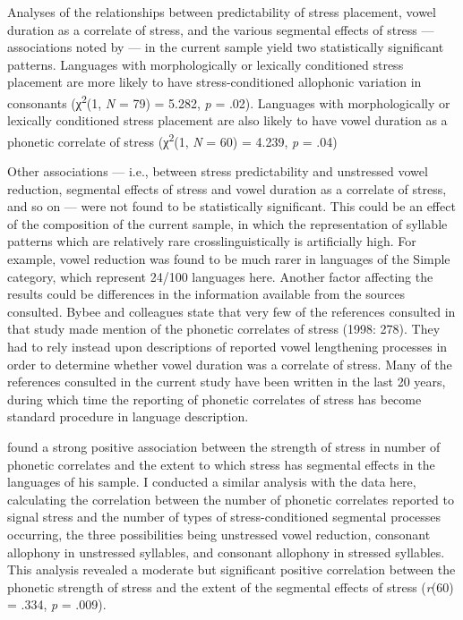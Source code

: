   Analyses of the relationships between predictability of stress placement, vowel duration as a correlate of stress, and the various segmental effects of stress — associations noted by \citet{BybeeEtAl1998} — in the current sample yield two statistically significant patterns. Languages with morphologically or lexically conditioned stress placement are more likely to have stress-conditioned allophonic variation in consonants (χ\textsuperscript{2}(1, \textit{N} = 79) = 5.282, \textit{p} = .02). Languages with morphologically or lexically conditioned stress placement are also likely to have vowel duration as a phonetic correlate of stress (χ\textsuperscript{2}(1, \textit{N} = 60) = 4.239, \textit{p} = .04)

  Other associations — i.e., between stress predictability and unstressed vowel reduction, segmental effects of stress and vowel duration as a correlate of stress, and so on — were not found to be statistically significant. This could be an effect of the composition of the current sample, in which the representation of syllable patterns which are relatively rare crosslinguistically is artificially high. For example, vowel reduction was found to be much rarer in languages of the Simple category, which represent 24/100 languages here. Another factor affecting the results could be differences in the information available from the sources consulted. Bybee and colleagues state that very few of the references consulted in that study made mention of the phonetic correlates of stress (1998: 278). They had to rely instead upon descriptions of reported vowel lengthening processes in order to determine whether vowel duration was a correlate of stress. Many of the references consulted in the current study have been written in the last 20 years, during which time the reporting of phonetic correlates of stress has become standard procedure in language description.

  \citet{Schiering2007} found a strong positive association between the strength of stress in number of phonetic correlates and the extent to which stress has segmental effects in the languages of his sample. I conducted a similar analysis with the data here, calculating the correlation between the number of phonetic correlates reported to signal stress and the number of types of stress-conditioned segmental processes occurring, the three possibilities being unstressed vowel reduction, consonant allophony in unstressed syllables, and consonant allophony in stressed syllables. This analysis revealed a moderate but significant positive correlation between the phonetic strength of stress and the extent of the segmental effects of stress (\textit{r}(60) = .334, \textit{p} = .009).


